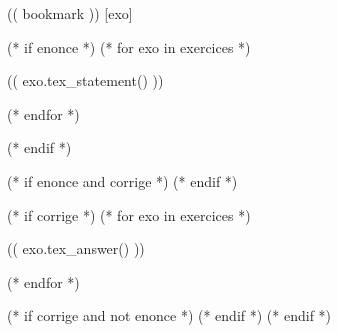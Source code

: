 \documentclass[a4paper,11pt]{article}
\newcounter{exo}
\begin{document}
(( bookmark ))
[exo]
\renewcommand{\thenocalcul}{\Alph{nocalcul}}
\raggedcolumns
\setlength{\columnseprule}{0.5pt}

(* if enonce *)
    (* for exo in exercices *)

(( exo.tex_statement() ))

    (* endfor *)

\label{LastPage}
(* endif *)

(* if enonce and corrige *)
\newpage
{}
\setcounter{page}{1}
\setcounter{exo}{0}
(* endif *)

(* if corrige *)
    (* for exo in exercices *)

(( exo.tex_answer() ))

    (* endfor *)

\label{LastCorPage}
(* if corrige and not enonce *)
\label{LastPage}
(* endif *)
(* endif *)
\end{document}
